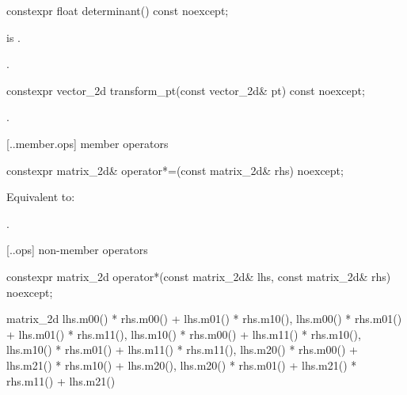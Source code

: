 %
\begin{itemdecl}
constexpr float determinant() const noexcept;
\end{itemdecl}
\begin{itemdescr}
\pnum
\requires
{} is .

\pnum
\returns
{}.
\end{itemdescr}

%
\begin{itemdecl}
constexpr vector_2d transform_pt(const vector_2d& pt) const noexcept;
\end{itemdecl}
\begin{itemdescr}
\pnum
\returns
{}.
\end{itemdescr}

 [\iotwod.\matrixtwod.member.ops] { member operators}

%
\begin{itemdecl}
constexpr matrix_2d& operator*=(const matrix_2d& rhs) noexcept;
\end{itemdecl}
\begin{itemdescr}
\pnum
\effects
Equivalent to: 

\pnum
\returns
{}.
\end{itemdescr}

 [\iotwod.\matrixtwod.ops] { non-member operators}

%
\begin{itemdecl}
constexpr matrix_2d operator*(const matrix_2d& lhs, const matrix_2d& rhs)
  noexcept;
\end{itemdecl}
\begin{itemdescr}
\pnum
\returns
\begin{codeblock}
matrix_2d{
  lhs.m00() * rhs.m00() + lhs.m01() * rhs.m10(),
  lhs.m00() * rhs.m01() + lhs.m01() * rhs.m11(),
  lhs.m10() * rhs.m00() + lhs.m11() * rhs.m10(),
  lhs.m10() * rhs.m01() + lhs.m11() * rhs.m11(),
  lhs.m20() * rhs.m00() + lhs.m21() * rhs.m10() + lhs.m20(),
  lhs.m20() * rhs.m01() + lhs.m21() * rhs.m11() + lhs.m21()
}
\end{codeblock}
\end{itemdescr}

